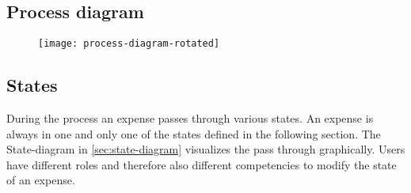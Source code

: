 \newpage
\subsection{Process diagram}
\label{sec:process-diagram-rotated}
	\begin{figure}[H]
		{\texttt{[image: process-diagram-rotated]}}
	\end{figure}
\newpage

\subsection{States}
\label{sec:states}
During the process an expense passes through various states. An expense is always in one and only one of the states defined in the following section. The State-diagram in \ref{sec:state-diagram} visualizes the pass through graphically. Users have different roles and therefore also different competencies to modify the state of an expense.

